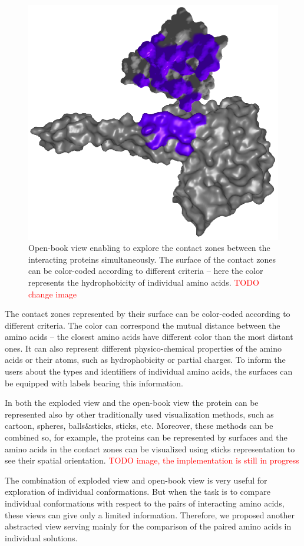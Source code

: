 \documentclass[journal]{vgtc}                %
\begin{document}
\begin{figure}[bt]
  \centering
  \includegraphics[width=0.8\columnwidth]{book.png}
  \caption{Open-book view enabling to explore the contact zones between the interacting proteins simultaneously. The surface of the contact zones can be color-coded according to different criteria -- here the color represents the hydrophobicity of individual amino acids. \textcolor{red}{TODO change image}}
  \label{fig:book}
\end{figure}

The contact zones represented by their surface can be color-coded according to different criteria.
The color can correspond the mutual distance between the amino acids -- the closest amino acids have different color than the most distant ones.
It can also represent different physico-chemical properties of the amino acids or their atoms, such as hydrophobicity or partial charges.
To inform the users about the types and identifiers of individual amino acids, the surfaces can be equipped with labels bearing this information.

In both the exploded view and the open-book view the protein can be represented also by other traditionally used visualization methods, such as cartoon, spheres, balls\&sticks, sticks, etc.
Moreover, these methods can be combined so, for example, the proteins can be represented by surfaces and the amino acids in the contact zones can be visualized using sticks representation to see their spatial orientation. \textcolor{red}{TODO image, the implementation is still in progress}

The combination of exploded view and open-book view is very useful for exploration of individual conformations.
But when the task is to compare individual conformations with respect to the pairs of interacting amino acids, these views can give only a limited information.
Therefore, we proposed another abstracted view serving mainly for the comparison of the paired amino acids in individual solutions.
\end{document}
